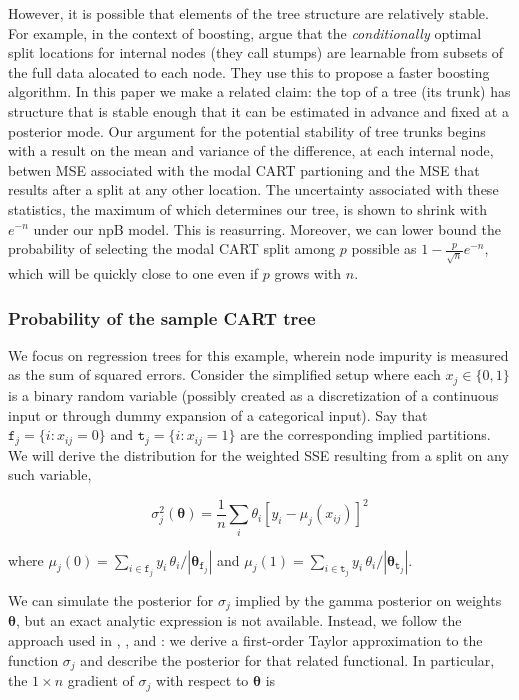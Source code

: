 \documentclass{article}
\begin{document}
However, it is possible that elements of the tree structure are
relatively stable. For example, in the context of boosting,
\cite{appel_quickly_2013} argue that the \emph{conditionally} optimal
split locations for internal nodes (they call stumps) are learnable from
subsets of the full data alocated to each node. They use this to propose
a faster boosting algorithm. In this paper we make a related claim: the
top of a tree (its trunk) has structure that is stable enough that it
can be estimated in advance and fixed at a posterior mode. Our argument
for the potential stability of tree trunks begins with a result on the
mean and variance of the difference, at each internal node, betwen MSE
associated with the modal CART partioning and the MSE that results after
a split at any other location. The uncertainty associated with these
statistics, the maximum of which determines our tree, is shown to shrink
with $e^{-n}$ under our npB model. This is reasurring. Moreover, we can
lower bound the probability of selecting the modal CART split among $p$
possible as $1 - \frac{p}{\sqrt{n}} e^{-n}$, which will be quickly close
to one even if $p$ grows with $n$.

    \subsubsection{Probability of the sample CART
tree}\label{probability-of-the-sample-cart-tree}

We focus on regression trees for this example, wherein node impurity is
measured as the sum of squared errors. Consider the simplified setup
where each $x_j \in \{0,1\}$ is a binary random variable (possibly
created as a discretization of a continuous input or through dummy
expansion of a categorical input). Say that
$\texttt{f}_j=\{i:x_{ij}=0\}$ and $\texttt{t}_j=\{i:x_{ij}=1\}$ are the
corresponding implied partitions. We will derive the distribution for
the weighted SSE resulting from a split on any such variable,

\[
\sigma^2_j(\boldsymbol{\theta}) = \frac{1}{n}\sum_i \theta_i \left[y_i - \mu_j(x_{ij})\right]^2
\]

where
$\mu_j(0) = \sum_{i \in \texttt{f}_j}y_i \,\theta_i/\left|\boldsymbol{\theta}_{\texttt{f}_j}\right|$
and
$\mu_j(1) = \sum_{i \in \texttt{t}_j}y_i \,\theta_i/\left|\boldsymbol{\theta}_{\texttt{t}_j}\right|$.

We can simulate the posterior for $\sigma_j$ implied by the gamma
posterior on weights $\boldsymbol{\theta}$, but an exact analytic
expression is not available. Instead, we follow the approach used in
\cite{lancaster_note_2003}, \cite{poirier_bayesian_2011}, and
\cite{taddy_heterogeneous_2014}: we derive a first-order Taylor
approximation to the function $\sigma_j$ and describe the posterior for
that related functional. In particular, the $1\times n$ gradient of
$\sigma_j$ with respect to $\boldsymbol{\theta}$ is
\end{document}
